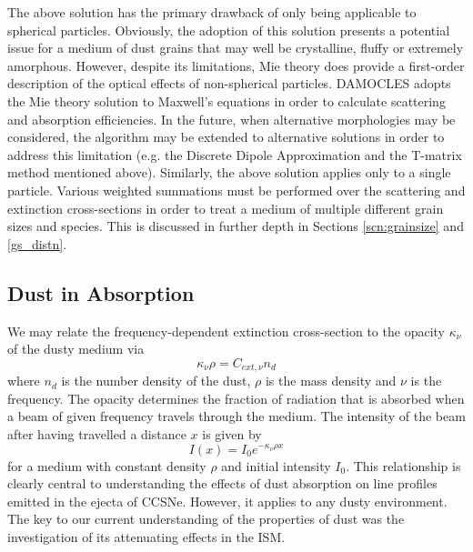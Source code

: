 The above solution has the primary drawback of only being applicable to spherical particles.  Obviously, the adoption of this solution presents a potential issue for a medium of dust grains that may well be crystalline, fluffy or extremely amorphous.  However, despite its limitations, Mie theory does provide a first-order description of the optical effects of non-spherical particles.  DAMOCLES adopts the Mie theory solution to Maxwell's equations in order to calculate scattering and absorption efficiencies.  In the future, when alternative morphologies may be considered, the algorithm may be extended to alternative solutions  in order to address this limitation (e.g. the Discrete Dipole Approximation and the T-matrix method mentioned above).  Similarly, the above solution applies only to a single particle.  Various weighted summations must be performed over the scattering and extinction cross-sections in order to treat a medium of multiple different grain sizes and species.  This is discussed in further depth in Sections \ref{scn:grainsize} and \ref{gs_distn}.

\subsection{Dust in Absorption}
\label{scn:abs}
We may relate the frequency-dependent extinction cross-section to the opacity $\kappa_{\nu}$ of the dusty medium via
\begin{equation}
\kappa_{\nu} \rho = C_{ext,\nu} n_d
\end{equation}
\noindent where $n_d$ is the number density of the dust, $\rho$ is the mass density and $\nu$ is the frequency.  The opacity determines the fraction of radiation that is absorbed when a beam of given frequency travels through the medium.  The intensity of the beam after having travelled a distance $x$ is given by
\begin{equation}
I(x)=I_0 e^{-\kappa_{\nu} \rho x}
\end{equation}
 for a medium with constant density $\rho$ and initial intensity $I_0$.  This relationship is clearly central to understanding the effects of dust absorption on line profiles emitted in the ejecta of CCSNe.  However, it applies to any dusty environment.  The key to our current understanding of the properties of dust was the investigation of its attenuating effects in the ISM.  
 
